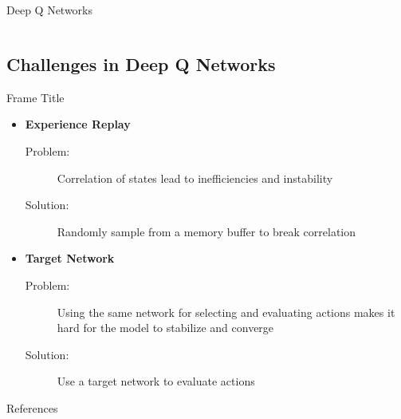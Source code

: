 \documentclass[xcolor=dvipsnames]{beamer}
\begin{document}
\begin{frame}{Deep Q Networks}
\begin{columns}
\begin{column}{0.48\textwidth}
\begin{block}
\begin{minipage}[c][2.5cm][c]{\linewidth}
                \end{minipage}
            \end{block}
        \end{column}
    \end{columns}
    \vspace{5mm}
\end{frame}

\subsection{Challenges in Deep Q Networks}
\begin{frame}{Frame Title}
    \begin{itemize}
        \item \textbf{Experience Replay}
        \begin{description}
            \item[Problem:] Correlation of states lead to inefficiencies and instability
            \item[Solution:] Randomly sample from a memory buffer to break correlation
        \end{description}
        \item \textbf{Target Network}
        \begin{description}
            \item[Problem:] Using the same network for selecting and evaluating actions makes it hard for the model to stabilize and converge
            \item[Solution:] Use a target network to evaluate actions
        \end{description}
    \end{itemize}
\end{frame}


\begin{frame}[allowframebreaks]{References}


\end{frame}
\end{document}
